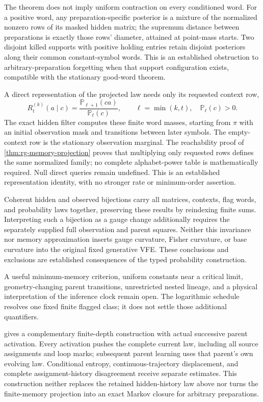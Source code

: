 The theorem does not imply uniform contraction on every conditioned word.
For a positive word, any preparation-specific posterior is a mixture of the
normalized nonzero rows of its masked hidden matrix; the supremum distance
between preparations is exactly those rows' diameter, attained at point-mass
starts. Two disjoint killed supports with positive holding entries retain
disjoint posteriors along their common constant-symbol words. This is an
established obstruction to arbitrary-preparation forgetting when that support
configuration exists, compatible with the stationary good-word theorem.

A direct representation of the projected law needs only its requested
context row,
\begin{equation}
 R_t^{(k)}(a\mid c)=\frac{\mathbb P_{\ell+1}(ca)}{\mathbb P_\ell(c)},
 \qquad \ell=\min(k,t),\quad\mathbb P_\ell(c)>0.
\label{eq:rg-memory-requested-context}
\end{equation}
The exact hidden filter computes these finite word masses, starting from
\(\pi\) with an initial observation mask and transitions between later
symbols. The empty-context row is the stationary observation marginal.
The reachability proof of \cref{thm:rg-memory-projection} proves that
multiplying only requested rows defines the same normalized family; no
complete alphabet-power table is mathematically required. Null direct
queries remain undefined. This is an established representation identity,
with no stronger rate or minimum-order assertion. 

Coherent hidden and observed bijections carry all matrices, contexts, flag
words, and probability laws together, preserving these results by reindexing
finite sums. Interpreting such a bijection as a gauge change additionally
requires the separately supplied full observation and parent squares.
Neither this invariance nor memory approximation inserts gauge curvature,
Fisher curvature, or base curvature into the original fixed generative VFE.
These conclusions and exclusions are established consequences of the typed
probability construction. 

A useful minimum-memory criterion, uniform constants near a critical limit,
geometry-changing parent transitions, unrestricted nested lineage, and a
physical interpretation of the inference clock remain open. The logarithmic
schedule resolves one fixed finite flagged class; it does not settle those
additional quantifiers. 

 gives a complementary finite-depth
construction with actual successive parent activation. Every activation
pushes the complete current law, including all source assignments and loop
marks; subsequent parent learning uses that parent's own evolving law.
Conditional entropy, continuous-trajectory displacement, and complete
assignment-history disagreement receive separate estimates. This
construction neither replaces the retained hidden-history law above nor
turns the finite-memory projection into an exact Markov closure for
arbitrary preparations. 
